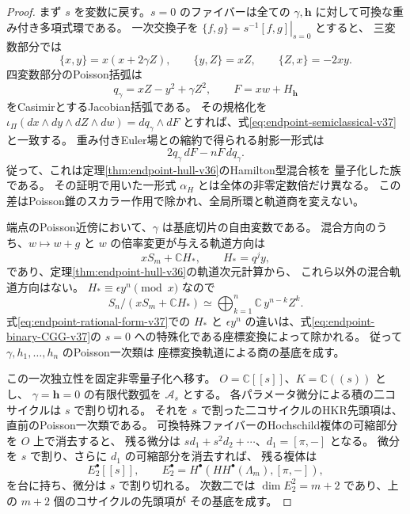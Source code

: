 \begin{proof}
まず $s$ を変数に戻す。$s=0$ のファイバーは全ての
$\gamma,\mathbf h$ に対して可換な重み付き多項式環である。
一次交換子を $\{f,g\}=\left.s^{-1}[f,g]\right|_{s=0}$ とすると、
三変数部分では
\begin{equation}
\label{eq:endpoint-semiclassical-v37}
 \{x,y\}=x(x+2\gamma Z),\qquad
 \{y,Z\}=xZ,\qquad
 \{Z,x\}=-2xy.
\end{equation}
四変数部分のPoisson括弧は
\[
 q_\gamma=xZ-y^2+\gamma Z^2,\qquad F=xw+H_{\mathbf h}
\]
をCasimirとするJacobian括弧である。
その規格化を
$\iota_\Pi(dx\wedge dy\wedge dZ\wedge dw)=dq_\gamma\wedge dF$
とすれば、式\eqref{eq:endpoint-semiclassical-v37}と一致する。
重み付きEuler場との縮約で得られる射影一形式は
\begin{equation}
\label{eq:endpoint-rational-form-v37}
 2q_\gamma\,dF-nF\,dq_\gamma.
\end{equation}
従って、これは定理\ref{thm:endpoint-hull-v36}のHamilton型混合核を
量子化した族である。
その証明で用いた一形式 $\alpha_H$ とは全体の非零定数倍だけ異なる。
この差はPoisson錐のスカラー作用で除かれ、全局所環と軌道商を変えない。

端点のPoisson近傍において、$\gamma$ は基底切片の自由変数である。
混合方向のうち、$w\mapsto w+g$ と $w$ の倍率変更が与える軌道方向は
\[
 xS_m+\mathbb C H_*,\qquad H_*=q^j y,
\]
であり、定理\ref{thm:endpoint-hull-v36}の軌道次元計算から、
これら以外の混合軌道方向はない。
$H_*\equiv\epsilon y^n\pmod{x}$ なので
\[
 S_n/(xS_m+\mathbb C H_*)
 \simeq \bigoplus_{k=1}^{n}\mathbb C\, y^{n-k}Z^k.
\]
式\eqref{eq:endpoint-rational-form-v37}での $H_*$ と
$\epsilon y^n$ の違いは、式\eqref{eq:endpoint-binary-CGG-v37}の
$s=0$ への特殊化である座標変換によって除かれる。
従って $\gamma,h_1,\ldots,h_n$ のPoisson一次類は
座標変換軌道による商の基底を成す。

この一次独立性を固定非零量子化へ移す。
$O=\mathbb C[[s]]$、$K=\mathbb C((s))$ とし、
$\gamma=\mathbf h=0$ の有限代数弧を $\mathcal A_s$ とする。
各パラメータ微分による積の二コサイクルは $s$ で割り切れる。
それを $s$ で割った二コサイクルのHKR先頭項は、直前のPoisson一次類である。
可換特殊ファイバーのHochschild複体の可縮部分を $O$ 上で消去すると、
残る微分は $s d_1+s^2d_2+\cdots$、$d_1=[\pi,-]$ となる。
微分を $s$ で割り、さらに $d_1$ の可縮部分を消去すれば、
残る複体は
\[
 E_2^\bullet[[s]],\qquad
 E_2^\bullet=H^\bullet(HH^\bullet(\Lambda_m),[\pi,-]),
\]
を台に持ち、微分は $s$ で割り切れる。
次数二では $\dim E_2^2=m+2$ であり、上の $m+2$ 個のコサイクルの先頭項が
その基底を成す。


\end{proof}
